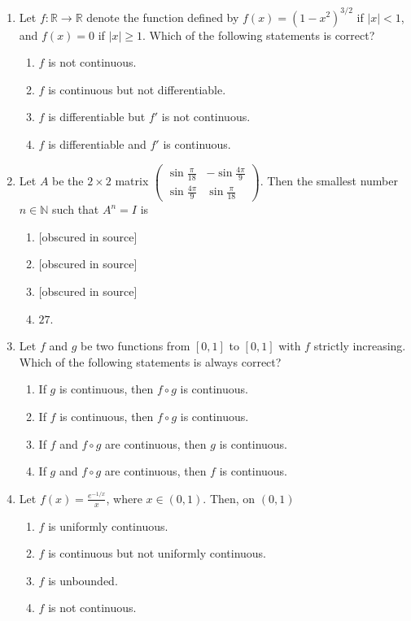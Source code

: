 \documentclass[11pt, a4paper]{article}
\begin{document}
\begin{enumerate}
  \item Let $f: \mathbb{R} \to \mathbb{R}$ denote the function defined by $f(x) = (1 - x^2)^{3/2}$ if $|x| < 1$, and $f(x) = 0$ if $|x| \ge 1$. Which of the following statements is correct?
  \begin{enumerate}[label=\Alph*.]
    \item $f$ is not continuous.
    \item $f$ is continuous but not differentiable.
    \item $f$ is differentiable but $f'$ is not continuous.
    \item $f$ is differentiable and $f'$ is continuous.
  \end{enumerate}

  \item Let $A$ be the $2 \times 2$ matrix $\begin{pmatrix} \sin\frac{\pi}{18} & -\sin\frac{4\pi}{9} \\ \sin\frac{4\pi}{9} & \sin\frac{\pi}{18} \end{pmatrix}$. Then the smallest number $n \in \mathbb{N}$ such that $A^n = I$ is
  \begin{enumerate}[label=\Alph*.]
    \item {[obscured in source]}
    \item {[obscured in source]}
    \item {[obscured in source]}
    \item $27$.
  \end{enumerate}

  \item Let $f$ and $g$ be two functions from $[0, 1]$ to $[0, 1]$ with $f$ strictly increasing. Which of the following statements is always correct?
  \begin{enumerate}[label=\Alph*.]
    \item If $g$ is continuous, then $f \circ g$ is continuous.
    \item If $f$ is continuous, then $f \circ g$ is continuous.
    \item If $f$ and $f \circ g$ are continuous, then $g$ is continuous.
    \item If $g$ and $f \circ g$ are continuous, then $f$ is continuous.
  \end{enumerate}

  \item Let $f(x) = \frac{e^{-1/x}}{x}$, where $x \in (0, 1)$. Then, on $(0, 1)$
  \begin{enumerate}[label=\Alph*.]
    \item $f$ is uniformly continuous.
    \item $f$ is continuous but not uniformly continuous.
    \item $f$ is unbounded.
    \item $f$ is not continuous.
  \end{enumerate}


\end{enumerate}
\end{document}
